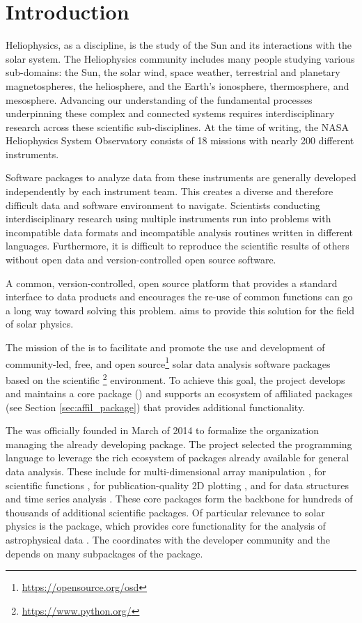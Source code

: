 \section{Introduction}
\label{sec:intro}

Heliophysics, as a discipline, is the study of the Sun and its interactions with the solar system.
The Heliophysics community includes many people studying various sub-domains: the Sun, the solar wind, space weather, terrestrial and planetary magnetospheres, the heliosphere, and the Earth's ionosphere, thermosphere, and mesosphere.
Advancing our understanding of the fundamental processes underpinning these complex and connected systems requires interdisciplinary research across these scientific sub-disciplines.
At the time of writing, the NASA Heliophysics System Observatory consists of 18 missions with nearly 200 different instruments.

Software packages to analyze data from these instruments are generally developed independently by each instrument team.
This creates a diverse and therefore difficult data and software environment to navigate.
Scientists conducting interdisciplinary research using multiple instruments run into problems with incompatible data formats and incompatible analysis routines written in different languages.
Furthermore, it is difficult to reproduce the scientific results of others without open data and version-controlled open source software.

A common, version-controlled, open source platform that provides a standard interface to data products and encourages the re-use of common functions can go a long way toward solving this problem.
\sunpyproj aims to provide this solution for the field of solar physics.

The mission of the \sunpyproj is to facilitate and promote the use and development of community-led, free, and open source\footnote{\url{https://opensource.org/osd}} solar data analysis software packages based on the scientific \python\footnote{\url{https://www.python.org/}} environment.
To achieve this goal, the project develops and maintains a core package (\sunpypkg) and supports an ecosystem of affiliated packages (see Section \ref{sec:affil_package}) that provides additional functionality.

The \sunpyproj was officially founded in March of 2014 to formalize the organization managing the already developing \sunpypkg package.
The project selected the \python programming language to leverage the rich ecosystem of packages already available for general data analysis.
These include \numpy for multi-dimensional array manipulation \citep{numpy}, \scipy for scientific functions \citep{scipy}, \matplotlib for publication-quality 2D plotting \citep{matplotlib}, and \pandas for data structures and time series analysis \citep{pandas}.
These core packages form the backbone for hundreds of thousands of additional scientific \python packages.
Of particular relevance to solar physics is the \astropypkg package, which provides core functionality for the analysis of astrophysical data \citep{astropy2018}.
The \sunpyproj coordinates with the \astropy developer community and the \sunpypkg depends on many subpackages of the \astropypkg package.

